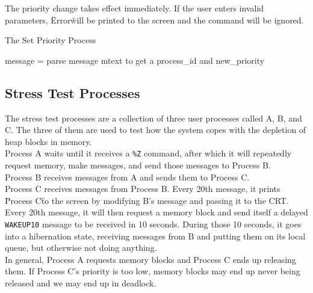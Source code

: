 \documentclass[12pt]{report}
\begin{document}
The priority change takes effect immediately. If the user enters invalid parameters, \"Error\" will be printed to the screen and the command will be ignored.\\

\begin{algorithm}
  \caption{The Set Priority Process}
  \begin{algorithmic}[1]
			\State message = 
			\State parse message mtext to get a process_id and new_priority
				\State {}
			\Else
			\EndIf
			\State {}
		\EndWhile
    \EndProcedure
  \end{algorithmic}
\end{algorithm}

\subsection{Stress Test Processes}

The stress test processes are a collection of three user processes called A, B, and C. The three of them are used to test how the system copes with the depletion of heap blocks in memory.\\

Process A waits until it receives a {\tt \%Z} command, after which it will repeatedly request memory, make messages, and send those messages to Process B.\\

Process B receives messages from A and sends them to Process C.\\

Process C receives messages from Process B. Every 20th message, it prints \"Process C\" to the screen by modifying B's message and passing it to the CRT. Every 20th message, it will then request a memory block and send itself a delayed {\tt WAKEUP10} message to be received in 10 seconds. During those 10 seconds, it goes into a hibernation state, receiving messages from B and putting them on its local queue, but otherwise not doing anything.\\

In general, Process A requests memory blocks and Process C ends up releasing them. If Process C's priority is too low, memory blocks may end up never being released and we may end up in deadlock.\\
\end{document}
